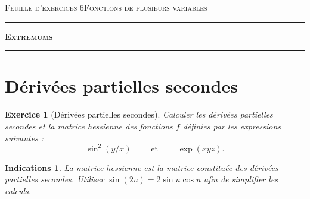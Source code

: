 \documentclass[11pt,a4paper]{article}
\theoremstyle{exostyle}
\newtheorem{exo}{Exercice}
\newtheorem{ind}{Indications}
\newcommand{\exercice}[1]{} \newcommand{\finexercice}{}
\newcommand{\enonce}{\begin{exo}} \newcommand{\finenonce}{\end{exo}}
\newcommand{\indication}{\begin{ind}} \newcommand{\finindication}{\end{ind}}
\begin{document}
	
	


\textsc{Feuille d'exercices 6}\hfill\textsc{Fonctions de plusieurs variables}

\vspace*{0.5ex}
\hrule\vspace*{1.5ex} 
\hfil{\textbf{\Large \textsc{Extremums}}}
\vspace*{1ex} \hrule 
\vspace*{5ex} 


\section{Dérivées partielles secondes}



\exercice{}  
\enonce[Dérivées partielles secondes]
Calculer les dérivées partielles secondes et la matrice hessienne des fonctions $f$ définies par les
expressions suivantes :
\[
\sin^2(y/x) \qquad \text{ et } \qquad \exp(xyz).
\]
\finenonce

\indication 
La matrice hessienne est la matrice
constituée des dérivées partielles secondes.
Utiliser $\sin(2u)=2\sin u \cos u$ afin de simplifier les calculs.
\finindication
\end{document}
